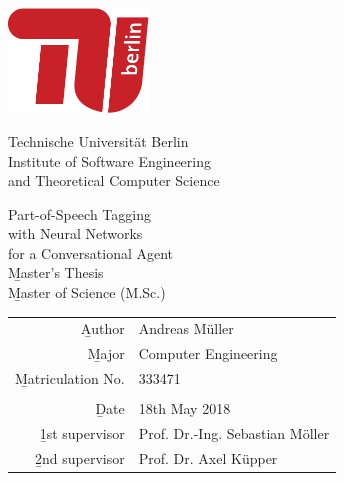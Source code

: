 
\pagestyle{empty}

\begin{center}
\includegraphics[width=0.28\textwidth]{images/logo_tu_berlin}
\vspace{8mm}

{\huge Technische Universität Berlin}\\
\vspace{2mm}
{\large Institute of Software Engineering\\and Theoretical Computer Science}\\
\vspace{11mm}

{\Huge Part-of-Speech Tagging\\[-2mm] with Neural Networks\\[-2mm] for a Conversational Agent\\}
\vspace{20mm}
{\Huge \b{Master's Thesis}}\\
{\b{Master of Science (M.Sc.)}}\\
\vspace{24mm}
\begin{tabular}{rl}
  \b{Author} & Andreas Müller\\
  \b{Major} & Computer Engineering\\
  \b{Matriculation No.} & 333471\\
   & \\
  \b{Date} & 18th May 2018 \\
  \b{1st supervisor} & Prof. Dr.-Ing. Sebastian Möller \\
  \b{2nd supervisor} & Prof. Dr. Axel Küpper \\
\end{tabular}

\end{center}
\clearpage
\pagestyle{scrheadings} %


